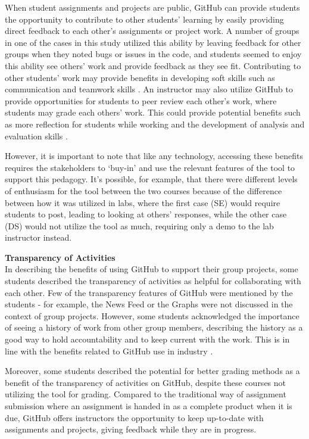 When student assignments and projects are public, GitHub can provide students the opportunity to contribute to other students' learning by easily providing direct feedback to each other's assignments or project work. A number of groups in one of the cases in this study utilized this ability by leaving feedback for other groups when they noted bugs or issues in the code, and students seemed to enjoy this ability see others' work and provide feedback as they see fit. Contributing to other students' work may provide benefits in developing soft skills such as communication and teamwork skills \cite{hamer2006some}. An instructor may also utilize GitHub to provide opportunities for students to peer review each other's work, where students may grade each others' work. This could provide potential benefits such as more reflection for students while working and the development of analysis and evaluation skills \cite{sondergaard2012collaborative}.

However, it is important to note that like any technology, accessing these benefits requires the stakeholders to `buy-in' and use the relevant features of the tool to support this pedagogy. It's possible, for example, that there were different levels of enthusiasm for the tool between the two courses because of the difference between how it was utilized in labs, where the first case (SE) would require students to post, leading to looking at others' responses, while the other case (DS) would not utilize the tool as much, requiring only a demo to the lab instructor instead.

\textbf{Transparency of Activities} \\
In describing the benefits of using GitHub to support their group projects, some students described the transparency of activities as helpful for collaborating with each other. Few of the transparency features of GitHub were mentioned by the students - for example, the News Feed or the Graphs were not discussed in the context of group projects. However, some students acknowledged the importance of seeing a history of work from other group members, describing the history as a good way to hold accountability and to keep current with the work. This is in line with the benefits related to GitHub use in industry \cite{dabbish2012social}.

Moreover, some students described the potential for better grading methods as a benefit of the transparency of activities on GitHub, despite these courses not utilizing the tool for grading. Compared to the traditional way of assignment submission where an assignment is handed in as a complete product when it is due, GitHub offers instructors the opportunity to keep up-to-date with assignments and projects, giving feedback while they are in progress.


